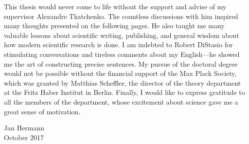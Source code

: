 This thesis would never come to life without the support and advise of my supervisor Alexandre Tkatchenko.
The countless discussions with him inspired many thoughts presented on the following pages.
He also taught me many valuable lessons about scientific writing, publishing, and general wisdom about how modern scientific research is done.
I am indebted to Robert DiStasio for stimulating conversations and tireless comments about my English---he showed me the art of constructing precise sentences.
My pursue of the doctoral degree would not be possible without the financial support of the Max Plack Society, which was granted by Matthias Scheffler, the director of the theory department at the Fritz Haber Institut in Berlin.
Finally, I would like to express gratitude to all the members of the department, whose excitement about science gave me a great sense of motivation.

\begin{flushright}
Jan Hermann \\
October 2017
\end{flushright}
